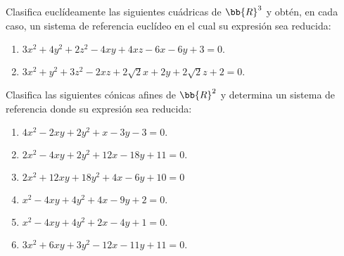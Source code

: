 \begin{ejercicio}
    Clasifica euclídeamente las siguientes cuádricas de $\bb{R}^3$ y obtén, en cada caso, un sistema de referencia euclídeo en el cual su expresión sea reducida:
    \begin{enumerate}
        \item $3x^2 + 4y^2 + 2z^2 - 4xy + 4xz - 6x - 6y + 3 = 0.$
        
        \begin{comment}
        Tenemos que la matriz asociada a dicha cuádrica es:
        \begin{equation*}
            \wh{A} = \left(\begin{array}{c|ccc}
                3 & -3 & -3 & 0  \\ \hline
                -3 & 3 & -2 & 2 \\
                -3 & -2 & 4 & 0 \\
                0 & 2 & 0 & 2
            \end{array}\right)
            = \left(\begin{array}{c|c}
                a & z \\ \hline
                z^t & A
            \end{array}\right)
        \end{equation*}
    

        Diagonalizamos $A$. Su polinomio característico es:
        \end{comment}
        
        \item $3x^2 + y^2 + 3z^2 - 2xz + 2\sqrt{2}x + 2y + 2\sqrt{2}z + 2 = 0.$
        
    \end{enumerate}
\end{ejercicio}




\begin{ejercicio}
    Clasifica las siguientes cónicas afines de $\bb{R}^2$ y determina un sistema de referencia donde su expresión sea reducida:
    \begin{enumerate}
        \item $4x^2 - 2xy + 2y^2 + x - 3y - 3 = 0.$        
        \item $2x^2 - 4xy + 2y^2 + 12x - 18y + 11 = 0.$
        \item $2x^2 + 12xy + 18y^2 + 4x - 6y + 10 = 0$
        \item $x^2 - 4xy + 4y^2 + 4x - 9y + 2 = 0.$
        \item $x^2 - 4xy + 4y^2 + 2x - 4y + 1 = 0.$
        \item $3x^2 + 6xy + 3y^2 - 12x - 11y + 11 = 0.$
    \end{enumerate}
\end{ejercicio}


